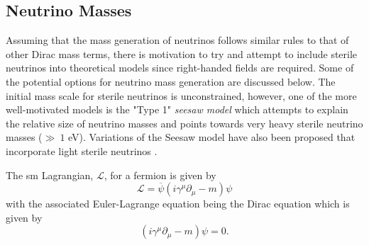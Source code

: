  

\subsection{Neutrino Masses}\label{subsec:nutrino_mass}

Assuming that the mass generation of neutrinos follows similar rules to that of other Dirac mass terms, there is motivation to try and attempt to include sterile neutrinos into theoretical models since right-handed fields are required. Some of the potential options for neutrino mass generation are discussed below. The initial mass scale for sterile neutrinos is unconstrained, however, one of the more well-motivated models is the "Type 1" \textit{seesaw model} which attempts to explain the relative size of neutrino masses and points towards very heavy sterile neutrino masses ($\gg ~1$ eV). Variations of the Seesaw model have also been proposed that incorporate light sterile neutrinos \cite{White_Paper}.

The \gls{sm} Lagrangian, $\mathcal{L}$, for a fermion is given by
\begin{equation}\label{eqn:SM Lagrangian}
    \mathcal{L} = \overline{\psi}(i\gamma^{\mu} \partial_{\mu} - m)\psi
\end{equation}
with the associated Euler-Lagrange equation being the Dirac equation which is given by \cite{Fundamentals_of_Neutrino_Physics_and_Astrophysics}
\begin{equation}
    (i\gamma^\mu\partial_\mu - m)\psi = 0.
\end{equation}
